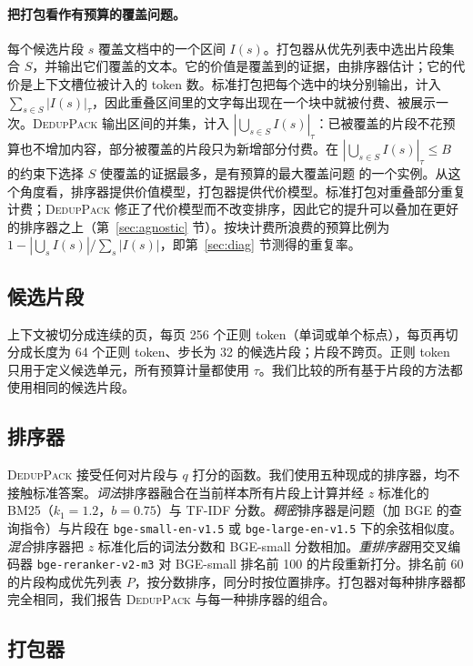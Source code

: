 \documentclass[11pt]{article}
\newcommand{\spk}{\textsc{DedupPack}}
\begin{document}
\paragraph{把打包看作有预算的覆盖问题。} 每个候选片段 $s$ 覆盖文档中的一个区间 $I(s)$。打包器从优先列表中选出片段集合 $S$，并输出它们覆盖的文本。它的价值是覆盖到的证据，由排序器估计；它的代价是上下文槽位被计入的 token 数。标准打包把每个选中的块分别输出，计入 $\sum_{s\in S}|I(s)|_\tau$，因此重叠区间里的文字每出现在一个块中就被付费、被展示一次。\spk{} 输出区间的并集，计入 $|\bigcup_{s\in S} I(s)|_\tau$：已被覆盖的片段不花预算也不增加内容，部分被覆盖的片段只为新增部分付费。在 $|\bigcup_{s\in S} I(s)|_\tau\le B$ 的约束下选择 $S$ 使覆盖的证据最多，是有预算的最大覆盖问题 \citep{khuller1999budgeted} 的一个实例。从这个角度看，排序器提供价值模型，打包器提供代价模型。标准打包对重叠部分重复计费；\spk{} 修正了代价模型而不改变排序，因此它的提升可以叠加在更好的排序器之上（第~\ref{sec:agnostic} 节）。按块计费所浪费的预算比例为 $1-|\bigcup_{s}I(s)|/\sum_{s}|I(s)|$，即第~\ref{sec:diag} 节测得的重复率。

\subsection{候选片段}
上下文被切分成连续的页，每页 256 个正则 token（单词或单个标点），每页再切分成长度为 64 个正则 token、步长为 32 的候选片段；片段不跨页。正则 token 只用于定义候选单元，所有预算计量都使用 $\tau$。我们比较的所有基于片段的方法都使用相同的候选片段。

\subsection{排序器}
\spk{} 接受任何对片段与 $q$ 打分的函数。我们使用五种现成的排序器，均不接触标准答案。\emph{词法}排序器融合在当前样本所有片段上计算并经 $z$ 标准化的 BM25（$k_1{=}1.2$，$b{=}0.75$）与 TF-IDF 分数。\emph{稠密}排序器是问题（加 BGE 的查询指令）与片段在 \texttt{bge-small-en-v1.5} 或 \texttt{bge-large-en-v1.5} \citep{xiao2023cpack} 下的余弦相似度。\emph{混合}排序器把 $z$ 标准化后的词法分数和 BGE-small 分数相加。\emph{重排序器}用交叉编码器 \texttt{bge-reranker-v2-m3} 对 BGE-small 排名前 100 的片段重新打分。排名前 60 的片段构成优先列表 $P$，按分数排序，同分时按位置排序。打包器对每种排序器都完全相同，我们报告 \spk{} 与每一种排序器的组合。

\subsection{打包器}
\end{document}
